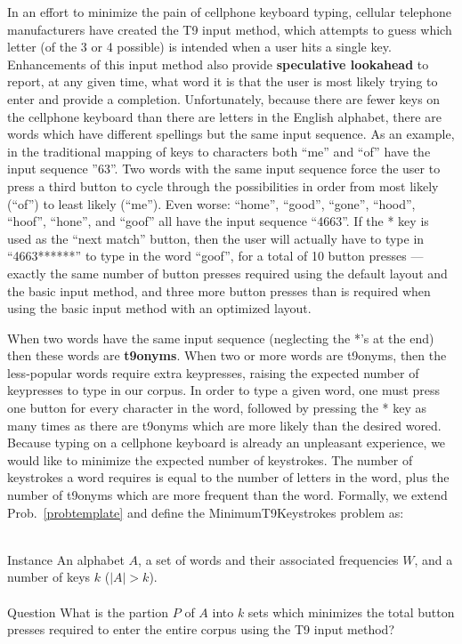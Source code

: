 \documentclass[runningheads]{llncs}
\newcommand{\newword}[1]{{\bf #1}}
\begin{document}
In an effort to minimize the pain of cellphone keyboard typing, cellular
telephone manufacturers have created the T9 input method, which attempts to
guess which letter (of the 3 or 4 possible) is intended when a user hits a
single key.  Enhancements of this input method also provide \newword{speculative
lookahead} to report, at any given time, what word it is that the user is most
likely trying to enter and provide a completion.  Unfortunately, because there
are fewer keys on the cellphone keyboard than there are letters in the English alphabet, there are words
which have different spellings but the same input sequence.  As an example, in
the traditional mapping of keys to characters
both ``me'' and ``of'' have the input sequence ''63''.  Two words with the same
input sequence force the user to press a third button to cycle through the
possibilities in order from most likely (``of'') to least likely (``me'').
Even worse: ``home'', ``good'', ``gone'', ``hood'', ``hoof'', ``hone'', and
``goof'' all have the input sequence ``4663''.  If the * key is used as the
``next match'' button, then the user will actually have to type in
``4663******'' to type in the word ``goof'', for a total of 10 button presses --- exactly the same number of button presses required using the default layout and the basic input method, and three more button presses than is required when using the basic input method with an optimized layout.

When two words have the same input sequence (neglecting the *'s at the end) then these words are \newword{t9onyms}.  When two or more words are t9onyms, then the less-popular words require extra keypresses, raising the expected number of keypresses to type in our corpus.  In order to type a given word, one must press one button for every character in the word, followed by pressing the * key as many times as there are t9onyms which are more likely than the desired wored.  Because typing on a cellphone keyboard is already an unpleasant experience, we would like to minimize the expected number of keystrokes.  The number of keystrokes a word requires is equal to the number of letters in the word, plus the number of t9onyms which are more frequent than the word.  Formally, we extend Prob.~\ref{probtemplate} and define the {\sc MinimumT9Keystrokes} problem as:

\begin{prob}~\\
\label{thm:minstrokes}
{\sc Instance} An alphabet $A$, a set of words and their associated frequencies $W$, and a number of keys $k$ ($|A| > k$).\\
~\\
{\sc Question} What is the partion $P$ of $A$ into $k$ sets which minimizes the total button presses required to enter the entire corpus using the T9 input method?
\end{prob}
\end{document}

